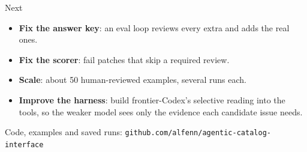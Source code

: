 \documentclass[aspectratio=169,11pt]{beamer}
\begin{document}
\begin{frame}{Next}
  \begin{itemize}
    \item \textbf{Fix the answer key}: an eval loop reviews every extra and adds the real ones.
    \item \textbf{Fix the scorer}: fail patches that skip a required review.
    \item \textbf{Scale}: about 50 human-reviewed examples, several runs each.
    \item \textbf{Improve the harness}: build frontier-Codex's selective reading into the tools,
      so the weaker model sees only the evidence each candidate issue needs.
  \end{itemize}
  \vfill
  {\small\color{muted} Code, examples and saved runs: \texttt{github.com/alfenn/agentic-catalog-interface}}
\end{frame}
\end{document}
